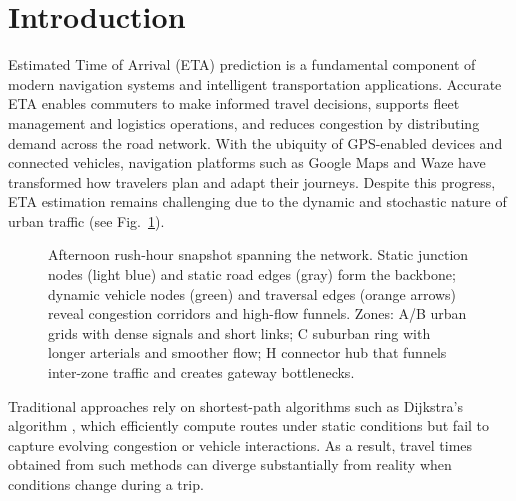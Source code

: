 \section{Introduction}
Estimated Time of Arrival (ETA) prediction is a fundamental component of modern navigation systems and intelligent transportation applications. Accurate ETA enables commuters to make informed travel decisions, supports fleet management and logistics operations, and reduces congestion by distributing demand across the road network. With the ubiquity of GPS-enabled devices and connected vehicles, navigation platforms such as Google Maps and Waze \cite{derrowpinion2021googlemaps,hoseinzadeh2020waze,amin-naseri2018waze} have transformed how travelers plan and adapt their journeys. Despite this progress, ETA estimation remains challenging due to the dynamic and stochastic nature of urban traffic (see Fig.~\ref{fig:rush-hour-intro}).

\begin{figure}[t]
    \centering
    \caption{Afternoon rush-hour snapshot spanning the network. Static junction nodes (light blue) and static road edges (gray) form the backbone; dynamic vehicle nodes (green) and traversal edges (orange arrows) reveal congestion corridors and high-flow funnels. Zones: A/B urban grids with dense signals and short links; C suburban ring with longer arterials and smoother flow; H connector hub that funnels inter-zone traffic and creates gateway bottlenecks.}
    \label{fig:rush-hour-intro}
\end{figure}

Traditional approaches rely on shortest-path algorithms such as Dijkstra's algorithm \cite{dijkstra1959}, which efficiently compute routes under static conditions but fail to capture evolving congestion or vehicle interactions. As a result, travel times obtained from such methods can diverge substantially from reality when conditions change during a trip.


